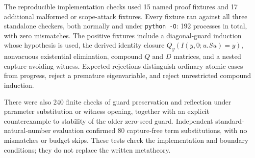 The reproducible implementation checks used 15 named proof fixtures and 17 additional malformed or scope-attack fixtures. Every fixture ran against all three standalone checkers, both normally and under \texttt{python -O}: 192 processes in total, with zero mismatches. The positive fixtures include a diagonal-guard induction whose hypothesis is used, the derived identity closure $Q_y(I(y,0;u.Su)=y)$, nonvacuous existential elimination, compound $Q$ and $D$ matrices, and a nested capture-avoiding witness. Expected rejections distinguish ordinary atomic cases from progress, reject a premature eigenvariable, and reject unrestricted compound induction.

There were also 240 finite checks of guard preservation and reflection under parameter substitution or witness opening, together with an explicit counterexample to stability of the older zero-seed guard. Independent standard-natural-number evaluation confirmed 80 capture-free term substitutions, with no mismatches or budget skips. These tests check the implementation and boundary conditions; they do not replace the written metatheory.
